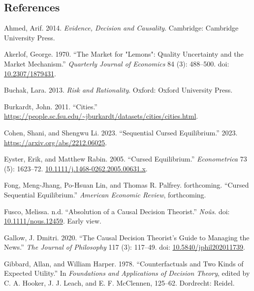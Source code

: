 \documentclass[
  11pt,
  letterpaper,
  DIV=11,
  numbers=noendperiod,
  twoside]{scrartcl}
\newlength{\cslhangindent}
\newenvironment{CSLReferences}[2] %
 {\begin{list}{}{%
  \setlength{\itemindent}{0pt}
  \setlength{\leftmargin}{0pt}
  \setlength{\parsep}{0pt}
  \ifodd #1
   \setlength{\leftmargin}{\cslhangindent}
   \setlength{\itemindent}{-1\cslhangindent}
  \fi
  \setlength{\itemsep}{#2\baselineskip}}}
 {\end{list}}
\begin{document}
\subsection*{References}\label{references}

\label{refs}
\begin{CSLReferences}{1}{0}
Ahmed, Arif. 2014. \emph{Evidence, Decision and Causality}. Cambridge:
{C}ambridge {U}niversity {P}ress.

Akerlof, George. 1970. {``The Market for "Lemons": Quality Uncertainty
and the Market Mechanism.''} \emph{Quarterly Journal of Economics} 84
(3): 488--500. doi:
\href{https://doi.org/10.2307/1879431}{10.2307/1879431}.

Buchak, Lara. 2013. \emph{Risk and Rationality}. Oxford: Oxford
University Press.

Burkardt, John. 2011. {``Cities.''}
\url{https://people.sc.fsu.edu/~jburkardt/datasets/cities/cities.html}.

Cohen, Shani, and Shengwu Li. 2023. {``Sequential Cursed Equilibrium.''}
2023. \url{https://arxiv.org/abs/2212.06025}.

Eyster, Erik, and Matthew Rabin. 2005. {``Cursed Equilibrium.''}
\emph{Econometrica} 73 (5): 1623--72.
\href{https://10.1111/j.1468-0262.2005.00631.x}{10.1111/j.1468-0262.2005.00631.x}.

Fong, Meng-Jhang, Po-Hsuan Lin, and Thomas R. Palfrey. forthcoming.
{``Cursed Sequential Equilibrium.''} \emph{American Economic Review},
forthcoming.

Fusco, Melissa. n.d. {``Absolution of a Causal Decision Theorist.''}
\emph{No{û}s}. doi:
\href{https://doi.org/10.1111/nous.12459}{10.1111/nous.12459}. Early
view.

Gallow, J. Dmitri. 2020. {``The Causal Decision Theorist's Guide to
Managing the News.''} \emph{The Journal of Philosophy} 117 (3): 117--49.
doi:
\href{https://doi.org/10.5840/jphil202011739}{10.5840/jphil202011739}.

Gibbard, Allan, and William Harper. 1978. {``Counterfactuals and Two
Kinds of Expected Utility.''} In \emph{Foundations and Applications of
Decision Theory}, edited by C. A. Hooker, J. J. Leach, and E. F.
McClennen, 125--62. Dordrecht: Reidel.


\end{CSLReferences}
\end{document}
